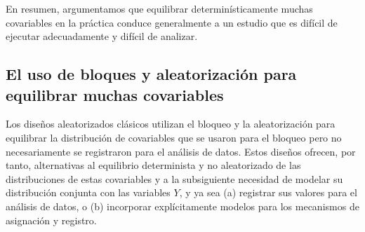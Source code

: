 \documentclass[12pt,a4paper]{article}
\begin{document}
En resumen, argumentamos que equilibrar determinísticamente muchas covariables en la práctica conduce generalmente a un estudio que es difícil de ejecutar adecuadamente y difícil de analizar.

\subsection{El uso de bloques y aleatorización para equilibrar muchas covariables}

Los diseños aleatorizados clásicos utilizan el bloqueo y la aleatorización para equilibrar la distribución de covariables que se usaron para el bloqueo pero no necesariamente se registraron para el análisis de datos. Estos diseños ofrecen, por tanto, alternativas al equilibrio determinista y no aleatorizado de las distribuciones de estas covariables y a la subsiguiente necesidad de modelar su distribución conjunta con las variables $Y$, y ya sea (a) registrar sus valores para el análisis de datos, o (b) incorporar explícitamente modelos para los mecanismos de asignación y registro.
\end{document}

